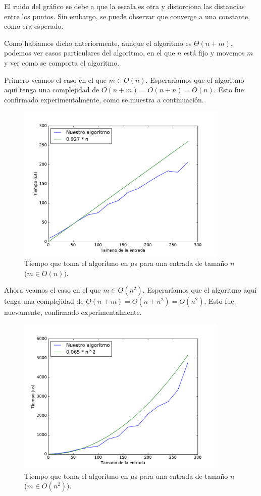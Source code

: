 El ruido del gráfico se debe a que la escala es otra y distorciona las distancias entre los puntos. Sin embargo, se puede observar que converge a una constante, como era esperado.


Como habiamos dicho anteriormente, aunque el algoritmo es $\Theta(n + m)$, podemos ver casos particulares del algoritmo, en el que $n$ está fijo y movemos $m$ y ver como se comporta el algoritmo.

Primero veamos el caso en el que $m \in O(n)$. Esperaríamos que el algoritmo aquí tenga una complejidad de $O(n + m) = O(n + n) = O(n)$. Esto fue confirmado experimentalmente, como se muestra a continuación.

\begin{figure}[H]
 \centering
	\includegraphics[width=0.9\textwidth]{img/exp/problema1-mejor.pdf}
	\caption{\footnotesize Tiempo que toma el algoritmo en $\mu$s para una entrada de tamaño $n$ ($m \in O(n))$.}
	\label{fig:problema1-mejor}
\end{figure}


Ahora veamos el caso en el que $m \in O(n^2)$. Esperaríamos que el algoritmo aquí tenga una complejidad de $O(n + m) = O(n + n^2) = O(n^2)$. Esto fue, nuevamente, confirmado experimentalmente.

\begin{figure}[H]
 \centering
	\includegraphics[width=0.9\textwidth]{img/exp/problema1-peor.pdf}
	\caption{\footnotesize Tiempo que toma el algoritmo en $\mu$s para una entrada de tamaño $n$ ($m \in O(n^2))$.}
	\label{fig:problema1-peor}
\end{figure}


